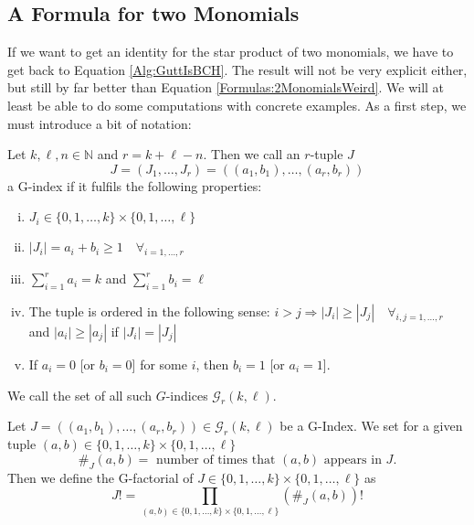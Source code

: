 %

\subsection{A Formula for two Monomials}

If we want to get an identity for the star product of two monomials, we have 
to get back to Equation \eqref{Alg:GuttIsBCH}. The result will not be very 
explicit either, but still by far better than Equation 
\eqref{Formulas:2MonomialsWeird}. We will at least be able to do some 
computations with concrete examples. As a first step, we must introduce 
a bit of notation:
\begin{definition}[G-Index]
	\label{Def:GuttIndex}
	Let $k, \ell, n \in \mathbb{N}$ and $r = k + \ell - n$. 
	Then we call an $r$-tuple $J$
	\begin{equation*}
		J = (J_1, \ldots, J_r) 
		= 
		((a_1, b_1), \ldots, (a_r, b_r)) 
	\end{equation*}
  	a G-index if it fulfils the following properties:
	\begin{enumerate}[(i)]
		\item
		$J_i \in \{0, 1, \ldots, k\} \times \{0, 1, \ldots, \ell\}$
		
  		\item 
		$|J_i| 
		= 
		a_i + b_i \geq 1 
		\quad \forall_{i = 1, \ldots, r}$
		
		\item 
		$\sum\limits_{i=1}^{r} a_i = k$ 
		and 
		$\sum\limits_{i=1}^{r} b_i = \ell$
		
		\item
		The tuple is ordered in the following sense:
		$i>j \Rightarrow |J_i| \geq |J_j| \quad \forall_{i,j = 1, 
		\ldots, r}$ and $|a_i| \geq |a_j|$ if $|J_i| = |J_j|$
		
		\item 
		If $a_i = 0$ [or $b_i = 0$] for some $i$, 
		then $b_i = 1$ [or $a_i = 1$].
	\end{enumerate}
	We call the set of all such $G$-indices	$\mathcal{G}_r(k,\ell)$.
\end{definition}
\begin{definition}[G-Factorial]
	\label{Def:GuttFactorial}
	Let $J = ((a_1, b_1), \ldots, (a_r, b_r)) \in \mathcal{G}_r(k,
	\ell)$ be a G-Index. We set for a given tuple $(a,b) \in \{0, 1, 
	\ldots, k\} \times \{0, 1, \ldots, \ell\}$
	\begin{equation*}
		\#_J (a,b)
		= 
		\textrm{ number of times that $(a,b)$ appears in } J.
	\end{equation*}
	Then we define the G-factorial of $J \in \{0, 1, \ldots, k\} \times 
	\{0, 1, \ldots, \ell\}$ as
	\begin{equation*}
		J!
		= 
		\prod\limits_{
			(a,b) \in 
			\{0, 1, \ldots, k\} 
			\times 
			\{0, 1, \ldots, \ell\}
		}
		\left( \#_J (a,b) \right)!
	\end{equation*}
\end{definition}
